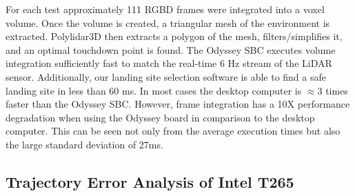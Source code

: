 For each test approximately 111 \ac{RGBD} frames were integrated into a voxel volume.  Once the volume is created, a triangular mesh of the environment is extracted.  Polylidar3D then extracts a polygon of the mesh, filters/simplifies it, and an optimal touchdown point is found. The Odyssey \ac{SBC} executes volume integration sufficiently fast to match the real-time 6 Hz stream of the LiDAR sensor. Additionally, our landing site selection software is able to find a safe landing site in less than 60 ms. In most cases the desktop computer is $\approx3$ times faster than the Odyssey \ac{SBC}. However, frame integration has a 10X performance degradation when using the Odyssey board in comparison to the desktop computer.  This can be seen not only from the average execution times but also the large standard deviation of 27ms. 

\begin{table}[H]
\centering
\caption{Mean and standard deviation of execution times (ms)}\label{table:ch7_execution_time}
\end{table}


\subsection{Trajectory Error Analysis of Intel T265}\label{sec:ch7_results_t265_accuracy}


